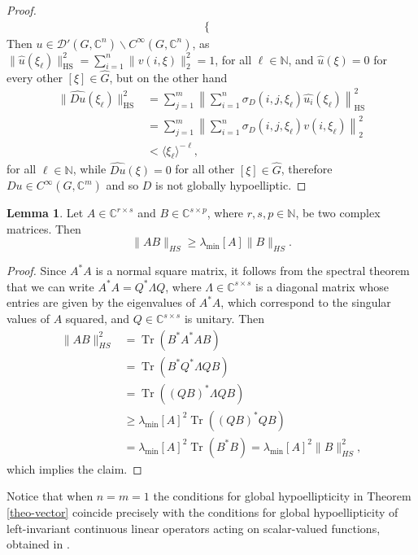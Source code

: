 \documentclass[11pt]{amsart}
\numberwithin{theorem}{section}
\numberwithin{equation}{section}
\theoremstyle{definition}
\numberwithin{example}{section}
\newtheorem{lemma}[theorem]{Lemma}
\theoremstyle{definition}
\theoremstyle{definition}
\newcommand{\N}{\mathbb{N}}
\newcommand{\C}{\mathbb{C}}
\newcommand{\Tr}{\operatorname{Tr}}
\newcommand{\HS}{\operatorname{HS}}
\begin{document}
\begin{proof}
\begin{align*}
\begin{cases}
        \end{cases} 
    \end{align*}
     Then $u\in\mathcal{D}'(G,\C^n)\backslash C^\infty(G,\C^n)$, as $\|\widehat{u}(\xi_\ell)\|_{\HS}^2=\sum_{i=1}^n\|v(i,\xi)\|_2^2=1$, for all $\ell\in\mathbb{N}$, and $\widehat{u}(\xi)=0$ for every other $[\xi]\in \widehat{G}$, but on the other hand
      \begin{align*}
        \|\widehat{{Du}}(\xi_\ell)\|_{\HS}^2&=\sum_{j=1}^{m}\left\|\sum_{i=1}^{n}\sigma_{{D}}(i,j,\xi_\ell)\widehat{u_i}(\xi_\ell)\right\|_{\HS}^2 \\
        &=\sum_{j=1}^{m}\left\|\sum_{i=1}^{n}\sigma_{{D}}(i,j,\xi_\ell)v(i,\xi_\ell)\right\|_{2}^2\\
        &<\langle \xi_\ell\rangle^{-\ell},
    \end{align*}
    for all $\ell\in\N$, while $\widehat{{Du}}(\xi)=0$ for all other $[\xi]\in\widehat{G}$,
    therefore $Du\in C^\infty(G,\C^m)$ and so $D$ is not globally hypoelliptic.
\end{proof}
\begin{lemma}\label{lemmasingvalue}
Let $A\in\mathbb{C}^{r\times s}$ and $B\in\mathbb{C}^{s\times p}$, where $r,s,p\in\N$, be two complex matrices. Then 
\begin{equation*}\label{ineqsingularvalue}
        \|AB\|_{HS}\geq \lambda_{\min}[A]\|B\|_{HS}.
    \end{equation*}
\end{lemma}
\begin{proof}
Since $A^*A$ is a normal square matrix, it follows from the spectral theorem that we can write  $A^*A=Q^*\Lambda Q$, where $\Lambda\in\mathbb{C}^{s\times s}$ is a diagonal matrix whose entries are given by the eigenvalues of $A^*A$, which correspond to the singular values of $A$ squared, and $Q\in\mathbb{C}^{s\times s}$ is unitary. Then 
\begin{align*}
    \|AB\|_{HS}^2&=\Tr(B^*A^*AB)\\
    &=\Tr(B^*Q^*\Lambda QB)\\
    &=\Tr((QB)^*\Lambda QB)\\
    &\geq \lambda_{\min}[A]^2\Tr((QB)^*QB)\\
    &=\lambda_{\min}[A]^2\Tr(B^*B)=\lambda_{\min}[A]^2\|B\|_{HS}^2,
\end{align*}    
which implies the claim.
\end{proof}

Notice that when $n=m=1$ the conditions for global hypoellipticity in Theorem \ref{theo-vector} coincide precisely with the conditions for global hypoellipticity of left-invariant continuous linear operators acting on scalar-valued functions, obtained in \cite[Theorem 20]{tese-Nicholas}.
\end{document}

